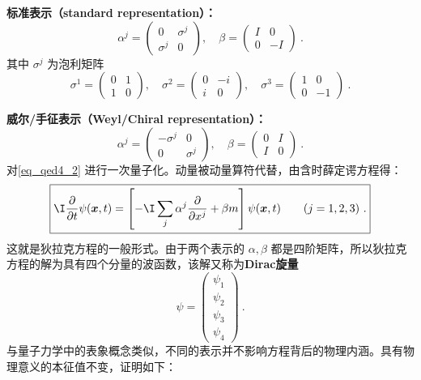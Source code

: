 \textbf{标准表示（standard representation）：}
\begin{equation}\label{eq_qed4_6}
\alpha^{j}=\left(\begin{array}{cc}
0 & \sigma^{j} \\
\sigma^{j} & 0
\end{array}\right), \quad \beta=\left(\begin{array}{rr}
I & 0 \\
0 & -I
\end{array}\right)~.
\end{equation}
其中 $\sigma^{j}$ 为泡利矩阵
\begin{equation}\label{eq_qed4_7}
\sigma^{1}=\left(\begin{array}{ll}
0 & 1 \\
1 & 0
\end{array}\right), \quad \sigma^{2}=\left(\begin{array}{rr}
0 & -i \\
i & 0
\end{array}\right), \quad \sigma^{3}=\left(\begin{array}{rr}
1 & 0 \\
0 & -1
\end{array}\right)~.
\end{equation}

\textbf{威尔/手征表示（Weyl/Chiral representation）：}
\begin{equation}\label{eq_qed4_8}
\alpha^{j}=\left(\begin{array}{cc}
-\sigma^{j} & 0 \\
0 & \sigma^{j}
\end{array}\right), \quad \beta=\left(\begin{array}{cc}
0 & I \\
I & 0
\end{array}\right)~.
\end{equation}
对\autoref{eq_qed4_2} 进行一次量子化。动量被动量算符代替，由含时薛定谔方程得：\begin{equation}\label{eq_qed4_9}
\boxed{ \I \frac{\partial}{\partial t} \psi(\boldsymbol{x}, t)=\left[- \I \sum_{j} \alpha^{j} \frac{\partial}{\partial x^{j}}+\beta m\right] \psi(\boldsymbol{x}, t) \qquad (j=1,2,3)~.}
\end{equation}
这就是狄拉克方程的一般形式。由于两个表示的 $\alpha,\beta$ 都是四阶矩阵，所以狄拉克方程的解为具有四个分量的波函数，该解又称为\textbf{Dirac旋量}
\begin{equation}\label{eq_qed4_10}
\psi=\left(\begin{array}{l}
\psi_{1} \\
\psi_{2} \\
\psi_{3} \\
\psi_{4}
\end{array}\right)~.
\end{equation}
与量子力学中的表象概念类似，不同的表示并不影响方程背后的物理内涵。具有物理意义的本征值不变，证明如下：

